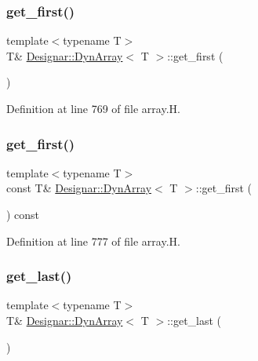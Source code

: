 \subsubsection{\texorpdfstring{get\+\_\+first()}{get\_first()}\hspace{0.1cm}{\footnotesize\ttfamily [1/2]}}
{\footnotesize\ttfamily template$<$typename T$>$ \\
T\& \hyperlink{class_designar_1_1_dyn_array}{Designar\+::\+Dyn\+Array}$<$ T $>$\+::get\+\_\+first (\begin{DoxyParamCaption}{ }\end{DoxyParamCaption})\hspace{0.3cm}{\ttfamily [inline]}}



Definition at line 769 of file array.\+H.

\mbox{\label{class_designar_1_1_dyn_array_a0b8735deaef51cfc0ff7c84994c3d838}} 
\subsubsection{\texorpdfstring{get\+\_\+first()}{get\_first()}\hspace{0.1cm}{\footnotesize\ttfamily [2/2]}}
{\footnotesize\ttfamily template$<$typename T$>$ \\
const T\& \hyperlink{class_designar_1_1_dyn_array}{Designar\+::\+Dyn\+Array}$<$ T $>$\+::get\+\_\+first (\begin{DoxyParamCaption}{ }\end{DoxyParamCaption}) const\hspace{0.3cm}{\ttfamily [inline]}}



Definition at line 777 of file array.\+H.

\mbox{\label{class_designar_1_1_dyn_array_ad69873465e7540a02fceaecc4ffc9b1e}} 
\subsubsection{\texorpdfstring{get\+\_\+last()}{get\_last()}\hspace{0.1cm}{\footnotesize\ttfamily [1/2]}}
{\footnotesize\ttfamily template$<$typename T$>$ \\
T\& \hyperlink{class_designar_1_1_dyn_array}{Designar\+::\+Dyn\+Array}$<$ T $>$\+::get\+\_\+last (\begin{DoxyParamCaption}{ }\end{DoxyParamCaption})\hspace{0.3cm}{\ttfamily [inline]}}




